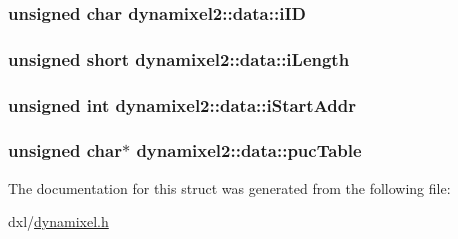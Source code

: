 \subsubsection[{i\+I\+D}]{\setlength{\rightskip}{0pt plus 5cm}unsigned char dynamixel2\+::data\+::i\+I\+D}\label{structdynamixel2_1_1data_ab60c037af9dfe1f3c62f15d0581a5837}
\hypertarget{structdynamixel2_1_1data_a7d8d57614c387663f0658bbf4b7a69eb}{}
\subsubsection[{i\+Length}]{\setlength{\rightskip}{0pt plus 5cm}unsigned short dynamixel2\+::data\+::i\+Length}\label{structdynamixel2_1_1data_a7d8d57614c387663f0658bbf4b7a69eb}
\hypertarget{structdynamixel2_1_1data_adfeca69c1b405b26a9381d53e3954156}{}
\subsubsection[{i\+Start\+Addr}]{\setlength{\rightskip}{0pt plus 5cm}unsigned int dynamixel2\+::data\+::i\+Start\+Addr}\label{structdynamixel2_1_1data_adfeca69c1b405b26a9381d53e3954156}
\hypertarget{structdynamixel2_1_1data_ae06fa51258979434fbc9f0e128824950}{}
\subsubsection[{puc\+Table}]{\setlength{\rightskip}{0pt plus 5cm}unsigned char$\ast$ dynamixel2\+::data\+::puc\+Table}\label{structdynamixel2_1_1data_ae06fa51258979434fbc9f0e128824950}


The documentation for this struct was generated from the following file\+:\begin{DoxyCompactItemize}
\item 
dxl/\hyperlink{dynamixel_8h}{dynamixel.\+h}\end{DoxyCompactItemize}
